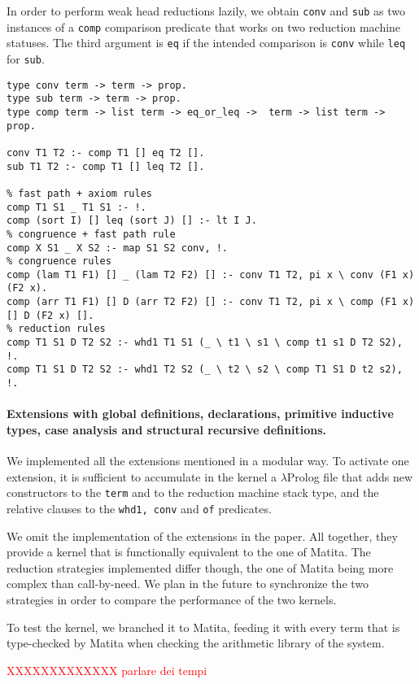 In order to perform weak head reductions lazily, we obtain \verb+conv+ and \verb+sub+ as two instances of a \verb+comp+ comparison predicate that works on two reduction machine statuses. The third argument is \verb+eq+ if the intended comparison is \verb+conv+ while \verb+leq+ for \verb+sub+.
\begin{Verbatim}
type conv term -> term -> prop.
type sub term -> term -> prop.
type comp term -> list term -> eq_or_leq ->  term -> list term -> prop.

conv T1 T2 :- comp T1 [] eq T2 [].
sub T1 T2 :- comp T1 [] leq T2 [].

% fast path + axiom rules
comp T1 S1 _ T1 S1 :- !.
comp (sort I) [] leq (sort J) [] :- lt I J.
% congruence + fast path rule
comp X S1 _ X S2 :- map S1 S2 conv, !.
% congruence rules
comp (lam T1 F1) [] _ (lam T2 F2) [] :- conv T1 T2, pi x \ conv (F1 x) (F2 x).
comp (arr T1 F1) [] D (arr T2 F2) [] :- conv T1 T2, pi x \ comp (F1 x) [] D (F2 x) [].
% reduction rules
comp T1 S1 D T2 S2 :- whd1 T1 S1 (_ \ t1 \ s1 \ comp t1 s1 D T2 S2), !.
comp T1 S1 D T2 S2 :- whd1 T2 S2 (_ \ t2 \ s2 \ comp T1 S1 D t2 s2), !.
\end{Verbatim}

\paragraph{Extensions with global definitions, declarations, primitive inductive types, case analysis and structural recursive definitions.}
We implemented all the extensions mentioned in a modular way. To activate one extension, it is sufficient to accumulate in the kernel a $\lambda$Prolog file that adds new constructors to the \verb+term+ and to the reduction machine stack type, and the relative clauses to the \verb+whd1, conv+ and \verb+of+ predicates.

We omit the implementation of the extensions in the paper. All together, they provide a kernel that is functionally equivalent to the one of Matita. The reduction strategies implemented differ though, the one of Matita being more complex than call-by-need. We plan in the future to synchronize the two strategies in order to compare the performance of the two kernels.

To test the kernel, we branched it to Matita, feeding it with every term that is type-checked by Matita when checking the arithmetic library of the system.

\textcolor{red}{XXXXXXXXXXXXX parlare dei tempi}
